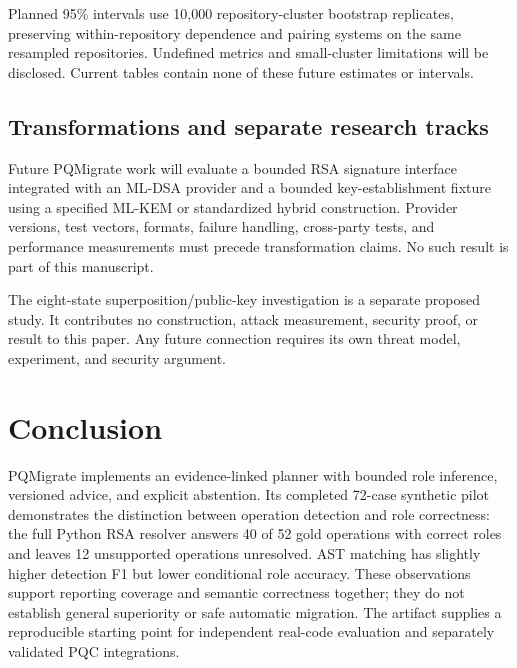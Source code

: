 \documentclass[conference,a4paper]{IEEEtran}
\begin{document}
Planned 95\% intervals use 10,000 repository-cluster bootstrap replicates, preserving within-repository dependence and pairing systems on the same resampled repositories. Undefined metrics and small-cluster limitations will be disclosed. Current tables contain none of these future estimates or intervals.

\subsection{Transformations and separate research tracks}

Future PQMigrate work will evaluate a bounded RSA signature interface integrated with an ML-DSA provider and a bounded key-establishment fixture using a specified ML-KEM or standardized hybrid construction. Provider versions, test vectors, formats, failure handling, cross-party tests, and performance measurements must precede transformation claims. No such result is part of this manuscript.

The eight-state superposition/public-key investigation is a separate proposed study. It contributes no construction, attack measurement, security proof, or result to this paper. Any future connection requires its own threat model, experiment, and security argument.

\section{Conclusion}

PQMigrate implements an evidence-linked planner with bounded role inference, versioned advice, and explicit abstention. Its completed 72-case synthetic pilot demonstrates the distinction between operation detection and role correctness: the full Python RSA resolver answers 40 of 52 gold operations with correct roles and leaves 12 unsupported operations unresolved. AST matching has slightly higher detection F1 but lower conditional role accuracy. These observations support reporting coverage and semantic correctness together; they do not establish general superiority or safe automatic migration. The artifact supplies a reproducible starting point for independent real-code evaluation and separately validated PQC integrations.
\end{document}
